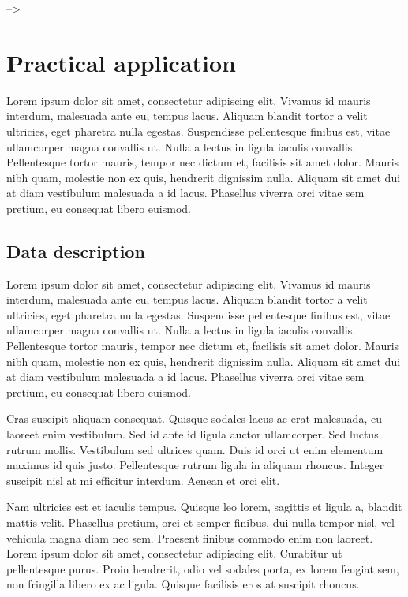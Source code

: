 \documentclass[a4paper, nobind]{templates/ociamthesis}
\theoremstyle{definition}
\theoremstyle{definition}
\theoremstyle{definition}
\theoremstyle{remark}
\begin{document}
--\textgreater{}

\hypertarget{chap:practical-app}{%
\chapter{\texorpdfstring{\textbf{Practical application}}{Practical application}}\label{chap:practical-app}}

\minitoc  


Lorem ipsum dolor sit amet, consectetur adipiscing elit. Vivamus id mauris interdum, malesuada ante eu, tempus lacus. Aliquam blandit tortor a velit ultricies, eget pharetra nulla egestas. Suspendisse pellentesque finibus est, vitae ullamcorper magna convallis ut. Nulla a lectus in ligula iaculis convallis. Pellentesque tortor mauris, tempor nec dictum et, facilisis sit amet dolor. Mauris nibh quam, molestie non ex quis, hendrerit dignissim nulla. Aliquam sit amet dui at diam vestibulum malesuada a id lacus. Phasellus viverra orci vitae sem pretium, eu consequat libero euismod.

\hypertarget{data-description}{%
\section{Data description}\label{data-description}}

Lorem ipsum dolor sit amet, consectetur adipiscing elit. Vivamus id mauris interdum, malesuada ante eu, tempus lacus. Aliquam blandit tortor a velit ultricies, eget pharetra nulla egestas. Suspendisse pellentesque finibus est, vitae ullamcorper magna convallis ut. Nulla a lectus in ligula iaculis convallis. Pellentesque tortor mauris, tempor nec dictum et, facilisis sit amet dolor. Mauris nibh quam, molestie non ex quis, hendrerit dignissim nulla. Aliquam sit amet dui at diam vestibulum malesuada a id lacus. Phasellus viverra orci vitae sem pretium, eu consequat libero euismod.

Cras suscipit aliquam consequat. Quisque sodales lacus ac erat malesuada, eu laoreet enim vestibulum. Sed id ante id ligula auctor ullamcorper. Sed luctus rutrum mollis. Vestibulum sed ultrices quam. Duis id orci ut enim elementum maximus id quis justo. Pellentesque rutrum ligula in aliquam rhoncus. Integer suscipit nisl at mi efficitur interdum. Aenean et orci elit.

Nam ultricies est et iaculis tempus. Quisque leo lorem, sagittis et ligula a, blandit mattis velit. Phasellus pretium, orci et semper finibus, dui nulla tempor nisl, vel vehicula magna diam nec sem. Praesent finibus commodo enim non laoreet. Lorem ipsum dolor sit amet, consectetur adipiscing elit. Curabitur ut pellentesque purus. Proin hendrerit, odio vel sodales porta, ex lorem feugiat sem, non fringilla libero ex ac ligula. Quisque facilisis eros at suscipit rhoncus.
\end{document}
